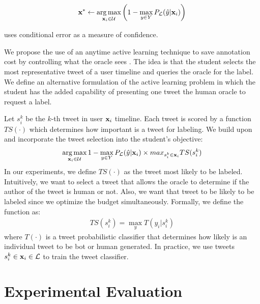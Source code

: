 \begin{equation}\label{eq:unc}
 {\mathbf x}^* \leftarrow \operatorname*{arg\,max}_{{\mathbf x}_i \in {\mathcal{U}}} \left(1- \max_{y \in Y} P_{{\mathcal{L}}}(\hat{y}|{\mathbf x}_i) \right)	
\end{equation}

 uses conditional error as a measure of confidence.

%
We propose the use of an anytime active learning technique to save annotation cost by controlling what the oracle sees \citep{ramirez:aaai14}. The idea is that the student selects the most representative tweet of a user timeline and queries the oracle for the label. We define an alternative formulation of the active learning problem in which the student has the added capability of presenting one tweet the human oracle to request a label. 

Let $s_i^k$ be the $k$-th tweet in user ${\mathbf x}_i$ timeline. Each tweet is scored by a function $TS(\cdot)$ which determines how important is a tweet for labeling. We build upon  and incorporate the tweet selection into the student's objective:
%
\begin{multline} \label{eq:obj}
    \operatorname*{arg\,max}_{ {\mathbf x}_i \in {\mathcal{U}}} 1- \max_{y \in Y} P_{{\mathcal{L}}}(\hat{y}|{\mathbf x}_i) \times max_{s_i^k \in {\mathbf x}_i} TS(s_i^k)
\end{multline}
%
In our experiments, we define $TS(\cdot)$ as the tweet most likely to be labeled. Intuitively, we want to select a tweet that allows the oracle to determine if the author of the tweet is human or not. Also, we want that tweet to be likely to be labeled since we optimize the budget simultaneously. Formally, we define the function as: 
%
\begin{align}
	TS(s_i^k) = \max_{y} T(y_i | s_i^k)
\end{align}
%
\noindent
where $T(\cdot)$  is a tweet probabilistic classifier that determines how likely is an individual tweet to be bot or human generated. In practice, we use tweets $s_i^k \in {\mathbf x}_i \in {\mathcal{L}}$ to train the tweet classifier.  


\section{Experimental Evaluation}


